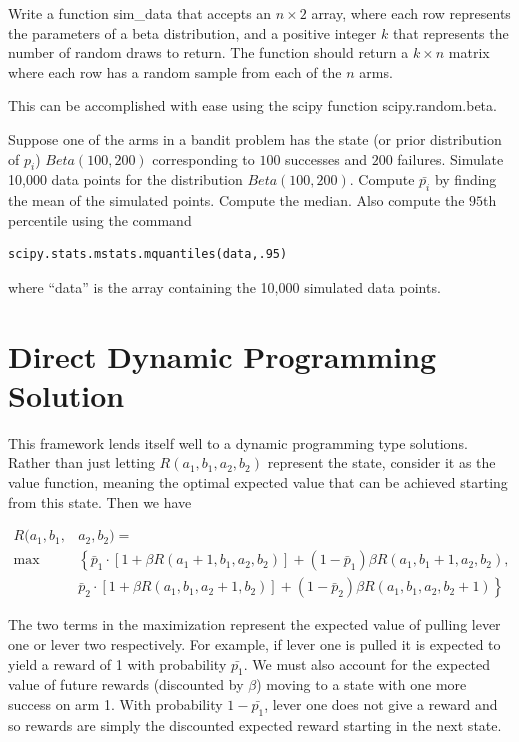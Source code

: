 \begin{problem}
Write a function sim\_data that accepts an $n\times 2$ array, where each row represents the parameters of a beta distribution, and a positive integer $k$ that represents the number of random draws to return.  The function should return a $k\times n$ matrix where each row has a random sample from each of the $n$ arms.

This can be accomplished with ease using the scipy function scipy.random.beta.
\end{problem}

\begin{problem}
Suppose one of the arms in a bandit problem has the state (or prior distribution of $p_i$) $Beta(100,200)$ corresponding to $100$ successes and $200$ failures.  Simulate 10,000 data points for the distribution $Beta(100,200)$.  Compute $\bar{p_i}$ by finding the mean of the simulated points.  Compute the median.  Also compute the $95$th percentile using the command

\begin{lstlisting}
scipy.stats.mstats.mquantiles(data,.95)
\end{lstlisting}
where ``data'' is the array containing the 10,000 simulated data points.
\end{problem}

\section*{Direct Dynamic Programming Solution}
This framework lends itself well to a dynamic programming type solutions.  Rather than just letting $R(a_1,b_1,a_2,b_2)$ represent the state, consider it as the value function, meaning the optimal expected value that can be achieved starting from this state.  Then we have

\begin{equation}\label{recurs}
\begin{aligned}
R(a_1,b_1,&a_2,b_2) =\\
 \max&\left\{\bar{p}_1\cdot[1 + \beta R(a_1+1,b_1,a_2,b_2)] + (1-\bar{p}_1)\beta R(a_1,b_1+1,a_2,b_2)\right. ,\\
&  \left.\bar{p}_2\cdot[1 + \beta R(a_1,b_1,a_2+1,b_2)] + (1-\bar{p}_2)\beta R(a_1,b_1,a_2,b_2+1)\right\}
\end{aligned}
\end{equation}

The two terms in the maximization represent the expected value of pulling lever one or lever two respectively.  For example, if lever one is pulled it is expected to yield a reward of 1 with probability $\bar{p_1}$.  We must also account for the expected value of future rewards (discounted by $\beta$) moving to a state with one more success on arm 1.  With probability $1-\bar{p_1}$, lever one does not give a reward and so rewards are simply the discounted expected reward starting in the next state.

